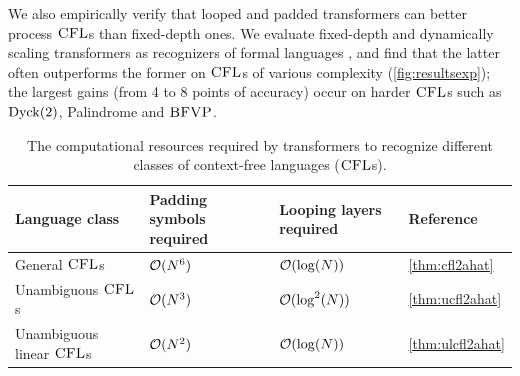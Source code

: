 \documentclass{article}
\begin{document}
We also empirically verify that looped and padded transformers can better process ${\textsc{CFL}}$s than fixed-depth ones. 
We evaluate fixed-depth and dynamically scaling transformers as recognizers of formal languages \citep{butoi2025trainingneuralnetworksrecognizers}, and find that the latter often outperforms the former on ${\textsc{CFL}}$s of various complexity (\cref{fig:resultsexp}); the largest gains (from 4 to 8 points of accuracy) occur on harder ${\textsc{CFL}}$s such as $\dyck{2}$, Palindrome and ${\textsc{BFVP}}$.

\begin{table}[t]
    \footnotesize
    \centering
    \renewcommand{\arraystretch}{1.15} 
    \begin{tabular}{
        >{\centering\arraybackslash}p{4.0cm} 
        >{\centering\arraybackslash}p{3.5cm} 
        >{\centering\arraybackslash}p{3.5cm} 
        >{\centering\arraybackslash}p{2.5cm} 
        }
        \toprule 
        \textbf{Language class} & \textbf{Padding symbols required} & \textbf{Looping layers required} & \textbf{Reference} \\
        \midrule
        General ${\textsc{CFL}}$s & ${{ \mathcal{O}}}({{ N}}^6)$ & ${{ \mathcal{O}}}(\log({{ N}}))$ & \cref{thm:cfl2ahat}\\
        Unambiguous ${\textsc{CFL}}$s & ${{ \mathcal{O}}}({{ N}}^3)$ & ${{ \mathcal{O}}}(\log^2({{ N}}))$ & \cref{thm:ucfl2ahat} \\
        Unambiguous linear ${\textsc{CFL}}$s & ${{ \mathcal{O}}}({{ N}}^2)$ & ${{ \mathcal{O}}}(\log({{ N}}))$ & \cref{thm:ulcfl2ahat} \\
        \bottomrule
    \end{tabular}
    \caption{The computational resources required by transformers to recognize different classes of context-free languages (${\textsc{CFL}}$s).}
    \label{tab:mainresults}
\end{table}
\end{document}
